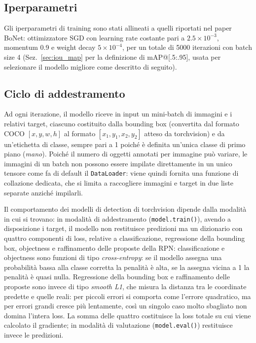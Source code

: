 \subsection{Iperparametri}

Gli iperparametri di training sono stati allineati a quelli riportati nel
paper BoNet: ottimizzatore SGD con learning rate costante pari a
$2.5\times10^{-3}$, momentum 0.9 e weight decay $5\times10^{-4}$, per un
totale di 5000 iterazioni con batch size 4 (Sez.~\ref{sec:iou_map} per
la definizione di mAP@[.5:.95], usata per selezionare il modello
migliore come descritto di seguito).

\subsection{Ciclo di addestramento}

Ad ogni iterazione, il modello riceve in input un mini-batch di immagini
e i relativi target, ciascuno costituito dalla bounding box (convertita
dal formato COCO $[x, y, w, h]$ al formato $[x_1, y_1, x_2, y_2]$
atteso da torchvision) e da un'etichetta di classe, sempre pari a 1
poiché è definita un'unica classe di primo piano (\emph{mano}). Poiché
il numero di oggetti annotati per immagine può variare, le immagini di
un batch non possono essere impilate direttamente in un unico tensore
come fa di default il \texttt{DataLoader}: viene quindi fornita una
funzione di collazione dedicata, che si limita a raccogliere immagini e
target in due liste separate anziché impilarli.

Il comportamento dei modelli di detection di torchvision dipende dalla
modalità in cui si trovano: in modalità di addestramento (\texttt{model.train()}),
avendo a disposizione i target, il modello non restituisce predizioni
ma un dizionario con quattro componenti di loss, relative a
classificazione, regressione della bounding box, objectness e
raffinamento delle proposte della RPN: classificazione e objectness
sono funzioni di tipo \emph{cross-entropy}: se il modello assegna una
probabilità bassa alla classe corretta la penalità è alta, se la
assegna vicina a 1 la penalità è quasi nulla. Regressione della
bounding box e raffinamento delle proposte sono invece di tipo
\emph{smooth L1}, che misura la distanza tra le coordinate predette e
quelle reali: per piccoli errori si comporta come l'errore quadratico,
ma per errori grandi cresce più lentamente, così un singolo caso molto
sbagliato non domina l'intera loss. La somma delle quattro costituisce
la loss totale su cui viene calcolato il gradiente; in modalità di
valutazione (\texttt{model.eval()}) restituisce invece le predizioni.

